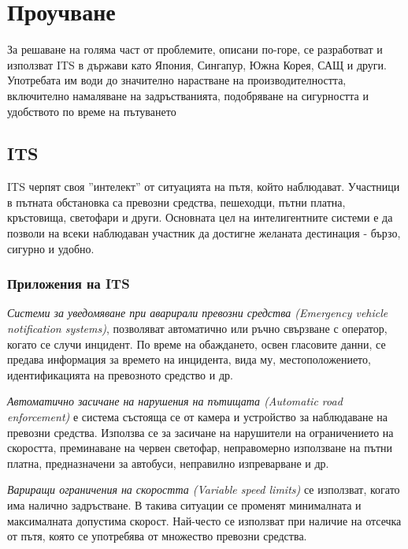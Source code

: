 \section{Проучване}

	За решаване на голяма част от проблемите, описани по-горе, се разработват и
	използват \ac{ITS} в държави като Япония, Сингапур, Южна Корея, САЩ и други.
	Употребата им води до значително нарастване на производителността, включително
	намаляване на задръстванията, подобряване на сигурността и удобството
	по време на пътуването \cite{Ezell}
	
	\subsection{\ac{ITS}}
	
	\ac{ITS} черпят своя ''интелект'' от ситуацията на пътя, който наблюдават. Участници в пътната
	обстановка са превозни средства, пешеходци, пътни платна, кръстовища, светофари и други.
	Основната цел на интелигентните системи е да позволи на всеки наблюдаван участник да
	достигне желаната дестинация - бързо, сигурно и удобно.
	
		\subsubsection{Приложения на \ac{ITS}}
		
			\emph{Системи за уведомяване при аварирали превозни средства (Emergency vehicle notification systems)},
			позволяват автоматично или ръчно свързване с оператор, когато се случи инцидент. По време
			на обаждането, освен гласовите данни, се предава информация за времето на инцидента, вида му,
			местоположението, идентификацията на превозното средство и др.
			
	    \emph{Автоматично засичане на нарушения на пътищата (Automatic road enforcement)} е система състояща
	    се от камера и устройство за наблюдаване на превозни средства. Използва се за засичане
	    на нарушители на ограничението на скоростта, преминаване на червен светофар, неправомерно
	    използване на пътни платна, предназначени за автобуси, неправилно изпреварване и др.
	    
	    \emph{Вариращи ограничения на скоростта (Variable speed limits)} се използват, когато
	    има налично задръстване. В такива ситуации се променят минималната и максималната допустима скорост.
	    Най-често се използват при наличие на отсечка от пътя, която се употребява от множество превозни средства.
	    
